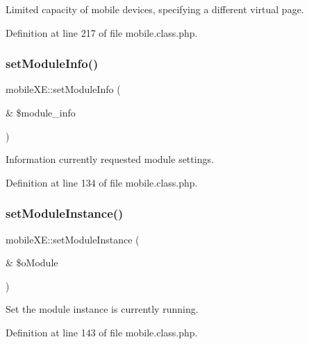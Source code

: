 Limited capacity of mobile devices, specifying a different virtual page. 



Definition at line 217 of file mobile.\+class.\+php.

\hypertarget{classmobileXE_a33d31bb2b41bb776645c36460644823c}{}\label{classmobileXE_a33d31bb2b41bb776645c36460644823c} 
\subsubsection{\texorpdfstring{set\+Module\+Info()}{setModuleInfo()}}
{\footnotesize\ttfamily mobile\+X\+E\+::set\+Module\+Info (\begin{DoxyParamCaption}\item[{\&}]{\$module\+\_\+info }\end{DoxyParamCaption})}



Information currently requested module settings. 



Definition at line 134 of file mobile.\+class.\+php.

\hypertarget{classmobileXE_af8c7a30ab2c9f7dced6b8aa7ace649b1}{}\label{classmobileXE_af8c7a30ab2c9f7dced6b8aa7ace649b1} 
\subsubsection{\texorpdfstring{set\+Module\+Instance()}{setModuleInstance()}}
{\footnotesize\ttfamily mobile\+X\+E\+::set\+Module\+Instance (\begin{DoxyParamCaption}\item[{\&}]{\$o\+Module }\end{DoxyParamCaption})}



Set the module instance is currently running. 



Definition at line 143 of file mobile.\+class.\+php.

\hypertarget{classmobileXE_a6c9c99c3df5a9345485026c74a796287}{}\label{classmobileXE_a6c9c99c3df5a9345485026c74a796287} 
